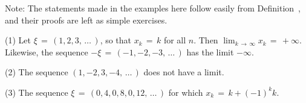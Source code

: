 \V

        Note: The statements made in the examples here follow easily from Definition~, and their proofs are left as simple exercises. %

\V

        (1) Let ${\xi} \,=\, (1,2,3,\,{\ldots}\,)$, so that $x_{k} \,=\, k$ for all $n$.
    Then $\lim_{k \,{\rightarrow}\, {\infty}} x_{k} \,=\, +{\infty}$. Likewise, the sequence $-{\xi} \,=\, (-1,-2,-3,\,{\ldots}\,)$ has the limit $-{\infty}$.

\V

        (2) The sequence $(1,-2,3,-4,\,{\ldots}\,)$ does not have a limit.

\V

        (3) The sequence ${\xi} \,=\, (0,4,0,8,0,12,\,{\ldots}\,)$ for which $x_{k} \,=\, k+(-1)^{k}k$.

\VV


